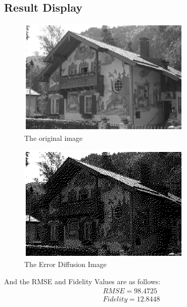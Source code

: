 \documentclass[paper=a4, fontsize=11pt]{scrartcl} %
\numberwithin{equation}{section} %
\numberwithin{figure}{section} %
\numberwithin{table}{section} %
\begin{document}
\subsection{Result Display}

\begin{figure}[H]
	
	\centering
	\includegraphics[height = 2.2in]{1.eps}
	\caption{The original image}
	
	
	
\end{figure}
\begin{figure}[H]
	
	\centering
	\includegraphics[height = 2.2in]{6.eps}
	\caption{The Error Diffusion Image}
	
	
\end{figure}
And the RMSE and Fidelity Values are as follows:
\centering
\begin{equation}
\begin{split}
RMSE =  98.4725\\
Fidelity =    12.8448
\end{split}
\end{equation}
\end{document}
